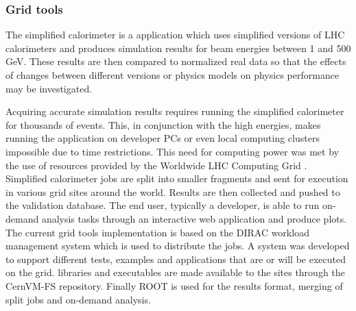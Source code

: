 
\subsubsection{Grid tools}
The simplified calorimeter is a \Gfour{} application which uses simplified 
versions of LHC calorimeters and produces simulation results for beam energies
between 1 and 500 GeV.  These results are then compared to normalized real data
so that the effects of changes between different \Gfour{} versions or physics
models on physics performance may be investigated.

Acquiring accurate simulation results requires running the simplified 
calorimeter for thousands of events.  This, in conjunction with the high 
energies, makes running the application on developer PCs or even local computing
clusters impossible due to time restrictions.  This need for computing power was
met by the use of resources provided by the Worldwide LHC Computing Grid 
\cite{GT:LHCG}.  
Simplified calorimeter jobs are split into smaller fragments and sent for 
execution in various grid sites around the world.  Results are then collected 
and pushed to the validation database.  The end user, typically a developer, is 
able to run on-demand analysis tasks through an interactive web application and 
produce plots.  The current grid tools implementation is based on the DIRAC 
workload management system which is used to distribute the jobs.  A system was 
developed to support different \Gfour{} tests, examples and applications that 
are or will be executed on the grid.  \Gfour{} libraries and executables are 
made available to the sites through the \Gfour{} CernVM-FS \cite{GT:CVMFS} 
repository.  Finally ROOT is used for the results format, merging of split jobs
and on-demand analysis.

